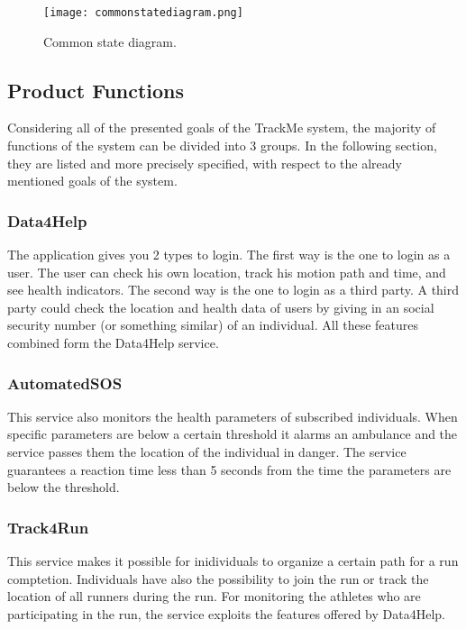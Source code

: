 \documentclass[12pt]{article}
\begin{document}
\begin{figure}[H]
\centering
\texttt{[image: commonstatediagram.png]}
\label{fig:Activity_T4R}
\caption{Common state diagram.}
\end{figure}
\newpage
\subsection{Product Functions}
Considering all of the presented goals of the TrackMe system, the majority of functions of the system can be divided into 3 groups. In the following section, they are listed and more precisely specified, with respect to the already mentioned goals of the system.
\subsubsection{Data4Help}
The application gives you 2 types to login. The first way is the one to login as a user. The user can check his own location, track his motion path and time, and see health indicators. The second way is the one to login as a third party. A third party could check the location and health data of users by giving in an social security number (or something similar) of an individual. All these features combined form the Data4Help service.
\subsubsection{AutomatedSOS} This service also monitors the health parameters of subscribed individuals. When specific parameters are below a certain threshold it alarms an ambulance and the service passes them the location of the individual in danger. The service guarantees a reaction time less than 5 seconds from the time the parameters are below the threshold.
\subsubsection{Track4Run}
This service makes it possible for inidividuals to organize a certain path for a run comptetion. Individuals have also the possibility to join the run or track the location of all runners during the run. For monitoring the athletes who are participating in the run, the service exploits the features offered by Data4Help. 
\end{document}
